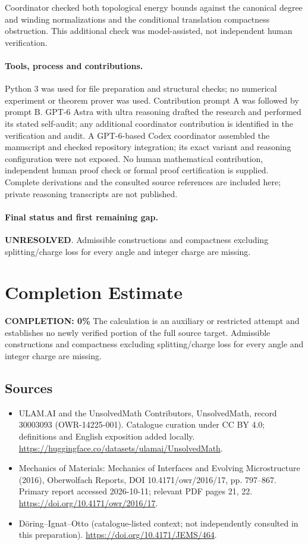\documentclass[11pt]{article}
\begin{document}
Coordinator checked both topological energy bounds against the canonical degree and winding normalizations and the conditional translation compactness obstruction. This additional check was model-assisted, not independent human verification.

\paragraph{Tools, process and contributions.}
Python 3 was used for file preparation and structural checks; no numerical experiment or theorem prover was used. Contribution prompt A was followed by prompt B. GPT-6 Astra with ultra reasoning drafted the research and performed its stated self-audit; any additional coordinator contribution is identified in the verification and audit. A GPT-6-based Codex coordinator assembled the manuscript and checked repository integration; its exact variant and reasoning configuration were not exposed. No human mathematical contribution, independent human proof check or formal proof certification is supplied. Complete derivations and the consulted source references are included here; private reasoning transcripts are not published.

\paragraph{Final status and first remaining gap.}
\textbf{UNRESOLVED}. Admissible constructions and compactness excluding splitting/charge loss for every angle and integer charge are missing.

\section{Completion Estimate}
\noindent\textbf{COMPLETION: 0\%}
The calculation is an auxiliary or restricted attempt and establishes no newly verified portion of the full source target. Admissible constructions and compactness excluding splitting/charge loss for every angle and integer charge are missing.

\subsection{Sources}
\begin{itemize}
\item[\hypertarget{source:30003093:1}{S1}] ULAM.AI and the UnsolvedMath Contributors, UnsolvedMath, record 30003093 (OWR-14225-001). Catalogue curation under CC BY 4.0; definitions and English exposition added locally.
\url{https://huggingface.co/datasets/ulamai/UnsolvedMath}.
\item[\hypertarget{source:30003093:2}{S2}] Mechanics of Materials: Mechanics of Interfaces and Evolving Microstructure (2016), Oberwolfach Reports, DOI 10.4171/owr/2016/17, pp. 797--867. Primary report accessed 2026-10-11; relevant PDF pages 21, 22.
\url{https://doi.org/10.4171/owr/2016/17}.
\item[\hypertarget{source:30003093:3}{S3}] Döring--Ignat--Otto (catalogue-listed context; not independently consulted in this preparation).
\url{https://doi.org/10.4171/JEMS/464}.
\end{itemize}
\label{end:30003093}
\end{document}
